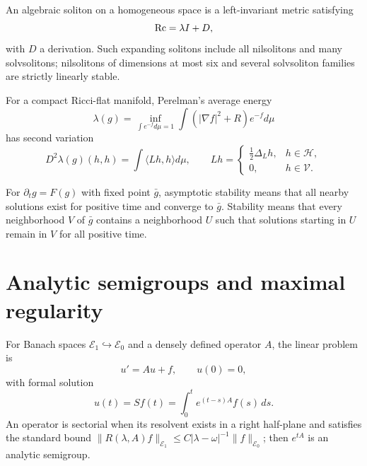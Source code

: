 An algebraic soliton on a homogeneous space is a left-invariant metric satisfying
\[
 \operatorname{Rc}=\lambda I+D,
\]
with $D$ a derivation.  Such expanding solitons include all nilsolitons and
many solvsolitons; nilsolitons of dimensions at most six and several
solvsoliton families are strictly linearly stable.

\begin{proposition}
\label{prop:chow-iv-perelman-lambda-second-variation}

For a compact Ricci-flat manifold, Perelman's average energy
\[
 \lambda(g)=\inf_{\int e^{-f}d\mu=1}\int(|\nabla f|^2+R)e^{-f}d\mu
 \tag{35.8}
\]
has second variation
\[
 D^2\lambda(g)(h,h)=\int\langle Lh,h\rangle d\mu,
 \qquad
 Lh=\begin{cases}\frac12\Delta_Lh,&h\in\mathcal H,\\0,&h\in\mathcal V.
 \end{cases}
\]
\end{proposition}

\begin{definition}
\label{def:chow-iv-dynamic-stability}


For $\partial_tg=F(g)$ with fixed point $\bar g$, asymptotic stability means
that all nearby solutions exist for positive time and converge to $\bar g$.
Stability means that every neighborhood $V$ of $\bar g$ contains a neighborhood
$U$ such that solutions starting in $U$ remain in $V$ for all positive time.
\end{definition}

\section{Analytic semigroups and maximal regularity}

For Banach spaces $\mathcal E_1\hookrightarrow\mathcal E_0$ and a densely
defined operator $A$, the linear problem is
\begin{equation*}
 u'=Au+f,\qquad u(0)=0,
 \tag{35.10}
\end{equation*}
with formal solution
\begin{equation*}
 u(t)=Sf(t)=\int_0^t e^{(t-s)A}f(s)\,ds.
 \tag{35.11}
\end{equation*}
An operator is sectorial when its resolvent exists in a right half-plane and
satisfies the standard bound $\|R(\lambda,A)f\|_{\mathcal E_1}\le
C|\lambda-\omega|^{-1}\|f\|_{\mathcal E_0}$; then $e^{tA}$ is an analytic
semigroup.

